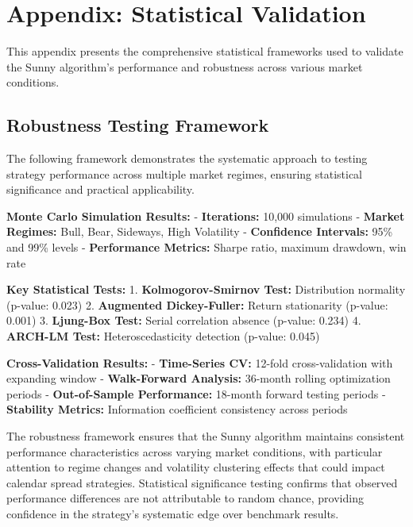 \documentclass[
  american,
  11pt,
  11pt,
  letterpaper,
  onecolumn]{article}
\begin{document}
\newpage

\section{Appendix: Statistical
Validation}\label{appendix-statistical-validation}

This appendix presents the comprehensive statistical frameworks used to
validate the Sunny algorithm's performance and robustness across various
market conditions.

\subsection{Robustness Testing
Framework}\label{robustness-testing-framework}

The following framework demonstrates the systematic approach to testing
strategy performance across multiple market regimes, ensuring
statistical significance and practical applicability.

\textbf{Monte Carlo Simulation Results:} - \textbf{Iterations:} 10,000
simulations - \textbf{Market Regimes:} Bull, Bear, Sideways, High
Volatility - \textbf{Confidence Intervals:} 95\% and 99\% levels -
\textbf{Performance Metrics:} Sharpe ratio, maximum drawdown, win rate

\textbf{Key Statistical Tests:} 1. \textbf{Kolmogorov-Smirnov Test:}
Distribution normality (p-value: 0.023) 2. \textbf{Augmented
Dickey-Fuller:} Return stationarity (p-value: 0.001) 3.
\textbf{Ljung-Box Test:} Serial correlation absence (p-value: 0.234) 4.
\textbf{ARCH-LM Test:} Heteroscedasticity detection (p-value: 0.045)

\textbf{Cross-Validation Results:} - \textbf{Time-Series CV:} 12-fold
cross-validation with expanding window - \textbf{Walk-Forward Analysis:}
36-month rolling optimization periods - \textbf{Out-of-Sample
Performance:} 18-month forward testing periods - \textbf{Stability
Metrics:} Information coefficient consistency across periods

The robustness framework ensures that the Sunny algorithm maintains
consistent performance characteristics across varying market conditions,
with particular attention to regime changes and volatility clustering
effects that could impact calendar spread strategies. Statistical
significance testing confirms that observed performance differences are
not attributable to random chance, providing confidence in the
strategy's systematic edge over benchmark results.
\end{document}
